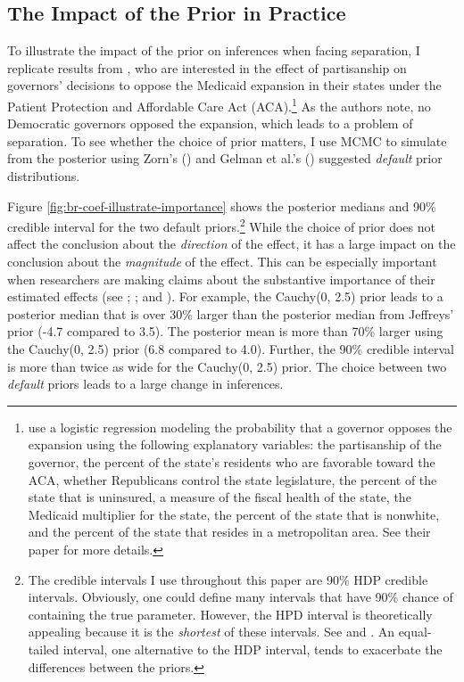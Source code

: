 \documentclass[12pt]{article}
\begin{document}
\subsection*{The Impact of the Prior in Practice}

To illustrate the impact of the prior on inferences when facing separation, I replicate results from \cite{BarrilleauxRainey2014}, who are interested in the effect of partisanship on governors' decisions to oppose the Medicaid expansion in their states under the Patient Protection and Affordable Care Act (ACA).\footnote{
\cite{BarrilleauxRainey2014} use a logistic regression modeling the probability that a governor opposes the expansion using the following explanatory variables: the partisanship of the governor, the percent of the state's residents who are favorable toward the ACA, whether Republicans control the state legislature, the percent of the state that is uninsured, a measure of the fiscal health of the state, the Medicaid multiplier for the state, the percent of the state that is nonwhite, and the percent of the state that resides in a metropolitan area. See their paper for more details.} 
As the authors note, no Democratic governors opposed the expansion, which leads to a problem of separation. 
To see whether the choice of prior matters, I use MCMC to simulate from the posterior using Zorn's (\citeyear{Zorn2005}) and Gelman et al.'s (\citeyear{Gelmanetal2008}) suggested \emph{default} prior distributions. 

Figure \ref{fig:br-coef-illustrate-importance} shows the posterior medians and 90\% credible interval for the two default priors.\footnote{
The credible intervals I use throughout this paper are 90\% HDP credible intervals. 
Obviously, one could define many intervals that have 90\% chance of containing the true parameter.
 However, the HPD interval is theoretically appealing because it is the \emph{shortest} of these intervals. 
 See \citet[esp. pp. 48-51]{Gill2008} and \citet[esp. p. 448]{CasellaBerger2002}. 
 An equal-tailed interval, one alternative to the HDP interval, tends to exacerbate the differences between the priors.} 
 While the choice of prior does not affect the conclusion about the \emph{direction} of the effect, it has a large impact on the conclusion about the \emph{magnitude} of the effect. 
 This can be especially important when researchers are making claims about the substantive importance of their estimated effects (see \citealt{KingTomzWittenberg2000}; \citealt{Rainey2014a}; and \citealt{Gross2014}). 
 For example, the Cauchy(0, 2.5) prior leads to a posterior median that is over 30\% larger than the posterior median from Jeffreys' prior (-4.7 compared to 3.5). 
 The posterior mean is more than 70\% larger using the Cauchy(0, 2.5) prior (6.8 compared to 4.0). 
 Further, the 90\% credible interval is more than twice as wide for the Cauchy(0, 2.5) prior. 
 The choice between two \emph{default} priors leads to a large change in inferences.
\end{document}
